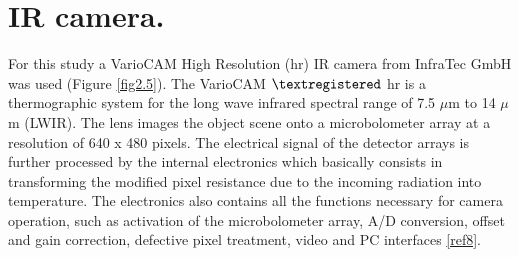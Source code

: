 	\section{IR camera.}\label{section2.3}
	
		For this study a VarioCAM High Resolution (hr) IR camera from InfraTec GmbH was used (Figure \ref{fig2.5}). The VarioCAM $\textregistered$ hr is a thermographic system for the long wave infrared spectral range of 7.5 $\mu$m to 14 $\mu$m (LWIR). The lens images the object scene onto a microbolometer array at a resolution of 640 x 480 pixels. The electrical signal of the detector arrays is further processed by the internal electronics which basically consists in transforming the modified pixel resistance due to the incoming radiation into temperature. The electronics also contains all the functions necessary for camera operation, such as activation of the microbolometer array, A/D conversion, offset and gain correction, defective pixel treatment, video and PC interfaces \ref{ref8}.
		
